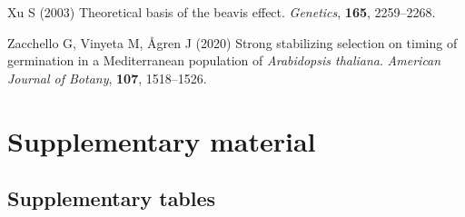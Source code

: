 \documentclass[]{article}
\begin{document}
\leavevmode\hypertarget{ref-xu2003theoretical}{}%
Xu S (2003) Theoretical basis of the beavis effect. \emph{Genetics}, \textbf{165}, 2259--2268.

\leavevmode\hypertarget{ref-zacchello2020strong}{}%
Zacchello G, Vinyeta M, Ågren J (2020) Strong stabilizing selection on timing of germination in a Mediterranean population of \emph{Arabidopsis thaliana}. \emph{American Journal of Botany}, \textbf{107}, 1518--1526.

\newpage

\hypertarget{supplementary-material}{%
\section*{Supplementary material}\label{supplementary-material}}

\setcounter{table}{0}  \renewcommand{\thetable}{S\arabic{table}} \setcounter{figure}{0} \renewcommand{\thefigure}{S\arabic{figure}}

\hypertarget{supplementary-tables}{%
\subsection{Supplementary tables}\label{supplementary-tables}}
\end{document}
